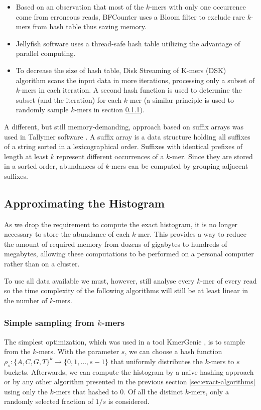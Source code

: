\begin{itemize}
\item Based on an observation that most of the $k$-mers with only one occurrence come from erroneous reads,
BFCounter \cite{Melsted2011} uses a Bloom filter to exclude rare $k$-mers from hash table thus saving memory.

\item Jellyfish \cite{Marcais2011} software uses a thread-safe hash table utilizing the advantage of parallel computing.

\item To decrease the size of hash table, Disk Streaming of K-mers (DSK) \cite{Rizk2013} algorithm scans the input data in more
iterations, processing only a subset of $k$-mers in each iteration. A second hash function is used to determine the subset
(and the iteration) for each $k$-mer (a similar principle is used to randomly sample $k$-mers in section \ref{sec:simple-sampling}).
\end{itemize}

A different, but still memory-demanding, approach based on suffix arrays was used in Tallymer software \cite{Kurtz2008}.
A suffix array is a data structure holding all suffixes of a string sorted in a lexicographical order. Suffixes with identical
prefixes of length at least $k$ represent different occurrences of a $k$-mer. Since they are stored in a sorted order, 
abundances of $k$-mers can be computed by grouping adjacent suffixes. 

\subsection{Approximating the Histogram}
As we drop the requirement to compute the exact histogram, it is no longer necessary to store the abundance of each $k$-mer.
This provides a way to reduce the amount of required memory from dozens of gigabytes 
to hundreds of megabytes, allowing these computations to be performed on a personal computer rather than on a cluster.  

To use all data available we must, however, still analyse every $k$-mer of every read so the time complexity of the
following algorithms will still be at least linear in the number of $k$-mers.

\subsubsection{Simple sampling from $k$-mers}
\label{sec:simple-sampling}
The simplest optimization, which was used in a tool KmerGenie \cite{Chikhi2013}, is to sample from the $k$-mers.
With the parameter $s$, we can choose a hash function $\rho_s: \{A,C,G,T\}^k \rightarrow \{0, 1, \dots, s-1\}$ 
that uniformly distributes the $k$-mers to $s$ buckets. Afterwards, we can compute the histogram by a naive
hashing approach or by any other algorithm presented in the previous section \ref{sec:exact-algorithms} using only
the $k$-mers that hashed to 0. Of all the distinct $k$-mers, only a randomly selected fraction of $1/s$ is considered.

